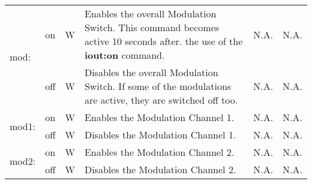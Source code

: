 \begin{center}
\begin{longtable}{| m{} | m{} | m{} | m{} | m{}| m{} |}
    \hline
    \multirow{2}{0.1\textwidth}{mod:}   & on & W & Enables the overall Modulation Switch. This command becomes active 10 seconds after.                                              the use of the \textbf{iout:on} command. &  N.A. & N.A. \\
                                        \cline{2-6}
                                        & off & W & Disables the overall Modulation Switch. If some of the modulations are active, they are switched off too. & N.A. & N.A. \\
    \hline 
    \multirow{2}{0.1\textwidth}{mod1:}   & on & W & Enables the Modulation Channel 1. &  N.A. & N.A. \\
                                        \cline{2-6}
                                        & off & W & Disables the Modulation Channel 1. & N.A. & N.A. \\
    \hline 
    \multirow{2}{0.1\textwidth}{mod2:}   & on & W & Enables the Modulation Channel 2. &  N.A. & N.A. \\
                                        \cline{2-6}
                                        & off & W & Disables the Modulation Channel 2. & N.A. & N.A. \\
    \hline 
    \end{longtable}
\end{center}







